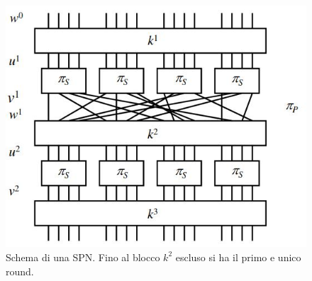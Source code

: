 \documentclass[a4paper,12pt, oneside]{book}
\begin{document}
\begin{figure}
  \centering
  \includegraphics[scale = 0.45]{img/snp.jpg}
  \caption{Schema di una SPN. Fino al blocco $k^2$ escluso si ha il
    primo e unico round.}
  \label{fig:spn}
\end{figure}
\end{document}
